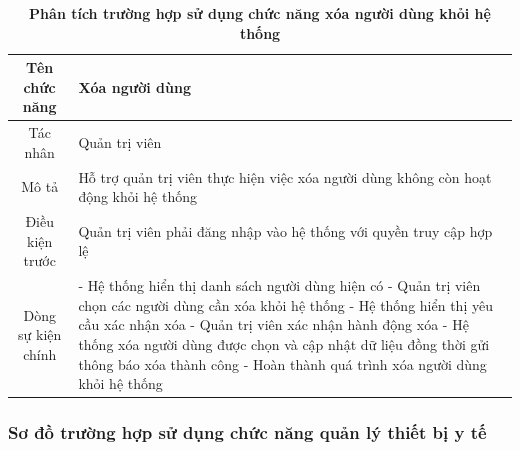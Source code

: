 \begin{table}[H]
	\caption{\bfseries \fontsize{12pt}{0pt}\selectfont Phân tích trường hợp sử dụng chức năng xóa người dùng khỏi hệ thống}
	\centering
	\begin{tabularx}{0.9\textwidth}{|c|X|}
		\hline
		\textbf{Tên chức năng} & \textbf{Xóa người dùng}                                                              \\
		\hline
		Tác nhân               & Quản trị viên                                                                        \\
		\hline
		Mô tả                  & Hỗ trợ quản trị viên thực hiện việc xóa người dùng không còn hoạt động khỏi hệ thống \\
		\hline
		Điều kiện trước        & Quản trị viên phải đăng nhập vào hệ thống với quyền truy cập hợp lệ                  \\
		\hline
		Dòng sự kiện chính     &
		- Hệ thống hiển thị danh sách người dùng hiện có \newline
		- Quản trị viên chọn các người dùng cần xóa khỏi hệ thống\newline
		- Hệ thống hiển thị yêu cầu xác nhận xóa \newline
		- Quản trị viên xác nhận hành động xóa \newline
		- Hệ thống xóa người dùng được chọn và cập nhật dữ liệu đồng thời gửi thông báo xóa thành công \newline
		- Hoàn thành quá trình xóa người dùng khỏi hệ thống                                                           \\
		\hline
	\end{tabularx}
\end{table}

\subsubsection{Sơ đồ trường hợp sử dụng chức năng quản lý thiết bị y tế}

